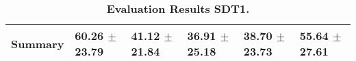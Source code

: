 \begin{table}[htb]
{\begin{tabular}{llllll}
\midrule
\textbf{Summary                                  } &                  \phantom{0}60.26 $\pm$ 23.79 &                      \phantom{0}41.12 $\pm$ 21.84 &                  \phantom{0}36.91 $\pm$ 25.18 &            \phantom{0}38.70 $\pm$ 23.73 &            \phantom{0}55.64 $\pm$ 27.61 \\
\bottomrule
\end{tabular}%
}
\caption{\textbf{Evaluation Results SDT1.}}
\label{tab:eval-results}
\end{table}


